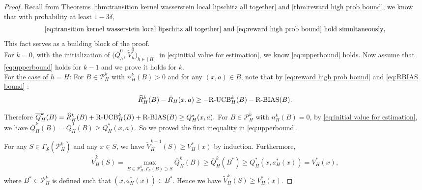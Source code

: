\documentclass[10pt,a4paper]{amsart}
\begin{document}
\begin{proof} 
Recall from Theorems \ref{thm:transition kernel wasserstein local lipschitz all together} and \ref{thm:reward high prob bound}, we know that with probability at least $1-3\delta$,
\begin{eqnarray}\label{eq:simultanuous_result}
   \eqref{eq:transition kernel wasserstein local lipschitz all together}  \mbox{ and }   \eqref{eq:reward high prob bound} \mbox{ hold simultaneously}, 
\end{eqnarray}
 This fact serves as a building  block of the proof.\\
   

For $k=0$, with the initialization of $(\overline{Q}_{h}^{0}$, $\widetilde{V}_h^0)_{h\in [H]}$ in  \eqref{eq:initial value for estimation}, we know \eqref{eq:upperbound} holds.
Now assume that \eqref{eq:upperbound} holds for $k-1$ and we prove it holds for $k$.\\

\noindent \underline{For the case of $h=H$}: 
   For $B \in \mathcal{P}_H^k$ with $n_H^k(B)>0$ and for any $(x,a) \in B$, note that by \eqref{eq:reward high prob bound} and \eqref{eq:RBIAS bound} : 
    \begin{eqnarray}
          \widehat{R}_H^k(B)-\bar{R}_{H}(x,a) \geq -\mbox{\rm R-UCB}_H^k(B)-\mbox{\rm R-BIAS}(B). 
    \end{eqnarray}

    Therefore
$
          \overline{Q}_{H}^{k}(B)=\widehat{R}_{H}^{k}(B)+\mbox{\rm R-UCB}_{H}^{k}(B)+\mbox{\rm R-BIAS}(B)
          \geq Q_{H}^{*}(x,a).        
$    For $B\in \mathcal{P}_H^k$ with $n_H^k(B)=0$, by \eqref{eq:initial value for estimation}, 
                  we have $\overline{Q}_{H}^{k}(B)=\overline{Q}_{H}^{0}(B)\geq Q_{H}^{*}(x,a).$ So we proved the first inequality in \eqref{eq:upperbound}.

For any $S \in \Gamma_{\mathcal{S}}(\mathcal{P}_H^k)$ and any $x\in S$, 
we have $\widetilde{V}_{H}^{k-1}(S)\ge V^*_H(x)$ by induction. 
Furthermore, 
   \begin{eqnarray*}
           \widetilde{V}_{H}^{k}(S)=\max_{B \in \mathcal{P}_H^k, \Gamma_{\mathcal{S}}(B) \supset S}\overline{Q}_{H}^{k}(B)\geq\overline{Q}_{H}^{k}(B^{*})\geq  Q_{H}^{*}(x,a_{H}^{*}(x))=V_{H}^{*}(x),
   \end{eqnarray*}
where $B^{*} \in \mathcal{P}_H^k$ is defined such that $(x,a_{H}^{*}(x)) \in B^{*}$. Hence 
we have $\widetilde{V}_{H}^{k}(S)\ge V^*_H(x)$. 


\end{proof}
\end{document}
